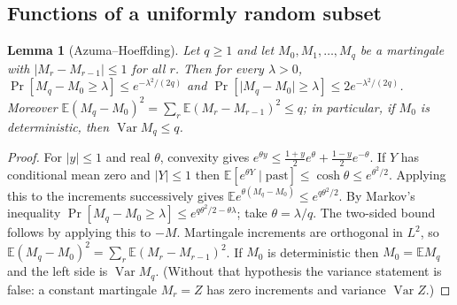 \documentclass[11pt]{article}
\newtheorem{lemma}{Lemma}[section]
\theoremstyle{definition}
\newcommand{\E}{\mathbb E}
\newcommand{\abs}[1]{\lvert #1\rvert}
\newcommand{\Var}{\operatorname{Var}}
\begin{document}
\subsection{Functions of a uniformly random subset}
\begin{lemma}[Azuma--Hoeffding]\label{lem:azuma}
Let $q\ge1$ and let $M_0,M_1,\dots,M_q$ be a martingale with $\abs{M_r-M_{r-1}}\le1$ for all $r$. Then for every
$\lambda>0$,
$\Pr[M_q-M_0\ge\lambda]\le e^{-\lambda^2/(2q)}$ and $\Pr[\abs{M_q-M_0}\ge\lambda]\le2e^{-\lambda^2/(2q)}$. Moreover
$\E(M_q-M_0)^2=\sum_{r}\E(M_r-M_{r-1})^2\le q$; in particular, if $M_0$ is deterministic, then $\Var M_q\le q$.
\end{lemma}
\begin{proof}
For $\abs y\le1$ and real $\theta$, convexity gives $e^{\theta y}\le\frac{1+y}2e^{\theta}+\frac{1-y}2e^{-\theta}$. If
$Y$ has conditional mean zero and $\abs Y\le1$ then $\E[e^{\theta Y}\mid\text{past}]\le\cosh\theta\le e^{\theta^2/2}$.
Applying this to the increments successively gives $\E e^{\theta(M_q-M_0)}\le e^{q\theta^2/2}$. By Markov's inequality
$\Pr[M_q-M_0\ge\lambda]\le e^{q\theta^2/2-\theta\lambda}$; take $\theta=\lambda/q$. The two-sided bound follows by
applying this to $-M$. Martingale increments are orthogonal in $L^2$, so
$\E(M_q-M_0)^2=\sum_r\E(M_r-M_{r-1})^2$. If $M_0$ is deterministic then $M_0=\E M_q$ and the left side is
$\Var M_q$. (Without that hypothesis the variance statement is false: a constant martingale $M_r=Z$ has zero
increments and variance $\Var Z$.)
\end{proof}
\end{document}
